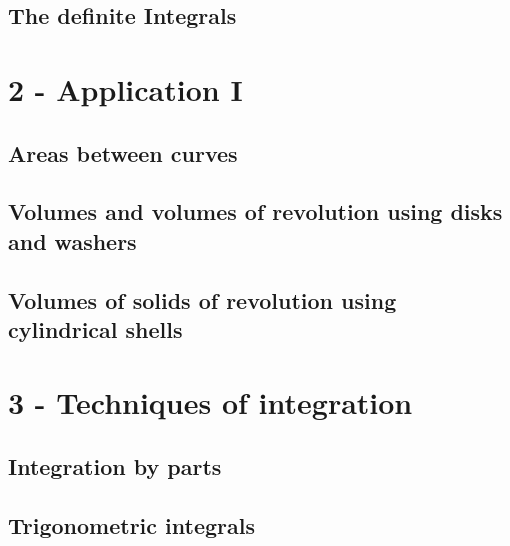 \documentclass[
]{article}
\begin{document}
\hypertarget{the-definite-integrals}{%
\subsection{The definite Integrals}\label{the-definite-integrals}}

\hypertarget{application-i}{%
\section{2 - Application I}\label{application-i}}

\hypertarget{areas-between-curves}{%
\subsection{Areas between curves}\label{areas-between-curves}}

\hypertarget{volumes-and-volumes-of-revolution-using-disks-and-washers}{%
\subsection{Volumes and volumes of revolution using disks and
washers}\label{volumes-and-volumes-of-revolution-using-disks-and-washers}}

\hypertarget{volumes-of-solids-of-revolution-using-cylindrical-shells}{%
\subsection{Volumes of solids of revolution using cylindrical
shells}\label{volumes-of-solids-of-revolution-using-cylindrical-shells}}

\hypertarget{techniques-of-integration}{%
\section{3 - Techniques of
integration}\label{techniques-of-integration}}

\hypertarget{integration-by-parts}{%
\subsection{Integration by parts}\label{integration-by-parts}}

\hypertarget{trigonometric-integrals}{%
\subsection{Trigonometric integrals}\label{trigonometric-integrals}}
\end{document}
